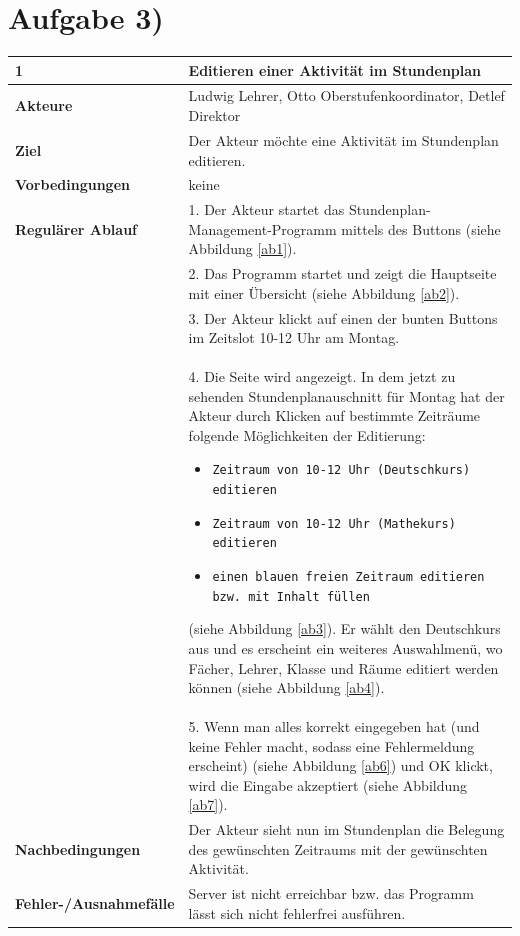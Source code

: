 \documentclass{swp1}
\begin{document}
\section*{Aufgabe 3)}

	
	\begin{tabular}
		{|p{5cm}|p{10cm}|} \hline \textbf{1} & \textbf{Editieren einer Aktivität im Stundenplan} \\
		\hline \textbf{Akteure} & Ludwig Lehrer, Otto Oberstufenkoordinator, Detlef Direktor\\
		\hline \textbf{Ziel} & Der Akteur möchte eine Aktivität im Stundenplan editieren. \\
		\hline \textbf{Vorbedingungen} & keine \\
		\hline \textbf{Regulärer Ablauf} & 1. Der Akteur startet das Stundenplan-Management-Programm mittels des Buttons (siehe Abbildung \ref{ab1}). \\
		&2. Das Programm startet und zeigt die Hauptseite mit einer Übersicht (siehe Abbildung \ref{ab2}). \\
		&3. Der Akteur klickt auf einen der bunten Buttons im Zeitslot 10-12 Uhr am Montag. \\
		&4. Die Seite wird angezeigt. In dem jetzt zu sehenden Stundenplanauschnitt für Montag hat der Akteur durch Klicken auf bestimmte Zeiträume folgende Möglichkeiten der Editierung:
		\begin{itemize}
		\item \texttt{Zeitraum von 10-12 Uhr (Deutschkurs) editieren}
		\item \texttt{Zeitraum von 10-12 Uhr (Mathekurs) editieren}
		\item \texttt{einen blauen freien Zeitraum editieren bzw. mit Inhalt füllen}
\end{itemize}	
(siehe Abbildung \ref{ab3}).	   
 Er wählt den Deutschkurs aus und es erscheint ein weiteres Auswahlmenü, wo Fächer, Lehrer, Klasse und Räume editiert werden können (siehe Abbildung \ref{ab4}).\\
&5. Wenn man alles korrekt eingegeben hat (und keine Fehler macht, sodass eine Fehlermeldung erscheint) (siehe Abbildung \ref{ab6}) und OK klickt, wird die Eingabe akzeptiert (siehe Abbildung \ref{ab7}).\\
		\hline \textbf{Nachbedingungen} & Der Akteur sieht nun im Stundenplan die Belegung des gewünschten Zeitraums mit der gewünschten Aktivität. \\
		\hline \textbf{Fehler-/Ausnahmefälle} & Server ist nicht erreichbar bzw. das Programm lässt sich nicht fehlerfrei ausführen. \\
		\hline 
	\end{tabular}
\end{document}

